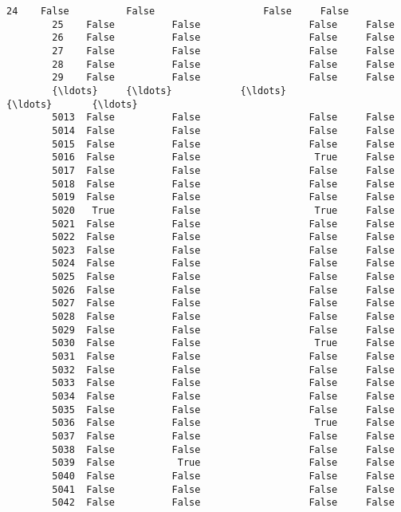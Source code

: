 \documentclass[11pt]{article}
\begin{document}
\begin{Verbatim}[commandchars=\\\{\}]
        24    False          False                   False     False   
        25    False          False                   False     False   
        26    False          False                   False     False   
        27    False          False                   False     False   
        28    False          False                   False     False   
        29    False          False                   False     False   
        {\ldots}     {\ldots}            {\ldots}                     {\ldots}       {\ldots}   
        5013  False          False                   False     False   
        5014  False          False                   False     False   
        5015  False          False                   False     False   
        5016  False          False                    True     False   
        5017  False          False                   False     False   
        5018  False          False                   False     False   
        5019  False          False                   False     False   
        5020   True          False                    True     False   
        5021  False          False                   False     False   
        5022  False          False                   False     False   
        5023  False          False                   False     False   
        5024  False          False                   False     False   
        5025  False          False                   False     False   
        5026  False          False                   False     False   
        5027  False          False                   False     False   
        5028  False          False                   False     False   
        5029  False          False                   False     False   
        5030  False          False                    True     False   
        5031  False          False                   False     False   
        5032  False          False                   False     False   
        5033  False          False                   False     False   
        5034  False          False                   False     False   
        5035  False          False                   False     False   
        5036  False          False                    True     False   
        5037  False          False                   False     False   
        5038  False          False                   False     False   
        5039  False           True                   False     False   
        5040  False          False                   False     False   
        5041  False          False                   False     False   
        5042  False          False                   False     False   
        

\end{Verbatim}
\end{document}
